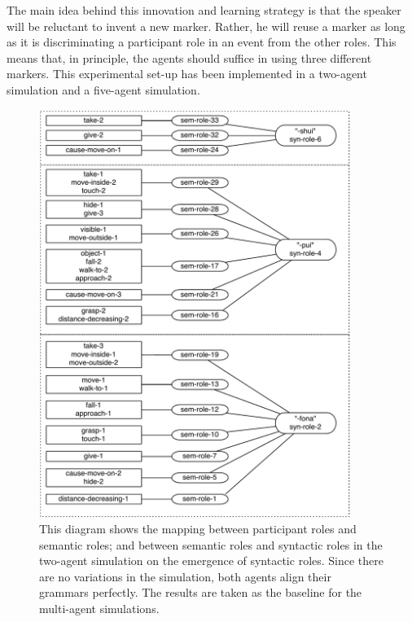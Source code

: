 The main idea behind this innovation and learning strategy is that the speaker will be reluctant to invent a new marker. Rather, he will reuse a marker as long as it is discriminating a participant role in an event from the other roles. This means that, in principle, the agents should suffice in using three different markers. This experimental set-up has been implemented in a two-agent simulation and a five-agent simulation.
\begin{figure}[p]
\centerline{\includegraphics[width=0.9\textwidth]{Chapter4/figs/two-agent}}
  \caption[Syntactic roles: the mapping for two agents]{This diagram shows the mapping between participant roles and semantic roles; and between semantic roles and syntactic roles in the two-agent simulation on the emergence of syntactic roles. Since there are no variations in the simulation, both agents align their grammars perfectly. The results are taken as the baseline for the multi-agent simulations.}
   \label{f:two-agent}
\end{figure}


